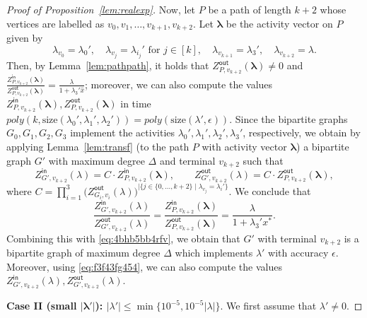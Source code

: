 \documentclass[11pt]{article}
\def\Zin{Z^{\mathsf{in}}}
\def\Zout{Z^{\mathsf{out}}}
\newcommand{\size}[1]{\mathrm{size}(#1)}
\def\lambdab{\ensuremath{\boldsymbol{\lambda}}}
\newcommand{\eps}{\epsilon}
\begin{document}
\begin{proof}[Proof of Proposition~\ref{lem:realexp}]
Now,  let $P$ be a path of length $k+2$ whose vertices are labelled as $v_0,v_1,\hdots,v_{k+1}, v_{k+2}$. Let $\lambdab$ be the activity vector on $P$ given by
\[\lambda_{v_0}=\lambda_0', \quad \lambda_{v_j}=\lambda_{i_j}' \mbox{ for $j\in[k]$}, \quad \lambda_{v_{k+1}}=\lambda_3', \quad \lambda_{v_{k+2}}=\lambda .\]
Then, by Lemma~\ref{lem:pathpath}, it holds that $\Zout_{P,v_{k+2}}(\lambdab)\neq 0$ and $\frac{\Zin_{P,v_{k+2}}(\lambdab)}{\Zout_{P,v_{k+2}}(\lambdab)}=\frac{\lambda}{1+\lambda_3' \hat{x}}$; moreover, we can also compute the values $\Zin_{P,v_{k+2}}(\lambdab),\Zout_{P,v_{k+2}}(\lambdab)$ in time $poly(k, \size{\lambda_0',\lambda_1',\lambda_2'})=poly(\size{\lambda',\eps})$. Since the bipartite graphs $G_0, G_1, G_2,G_3$ implement the activities $\lambda_0',\lambda_1',\lambda_2',\lambda_3'$, respectively, we obtain by applying Lemma~\ref{lem:transf} (to the path $P$ with activity vector $\lambdab$) a bipartite graph $G'$ with maximum degree $\Delta$ and terminal $v_{k+2}$ such that 
\begin{equation}\label{eq:f3f43fg454}
\Zin_{G',v_{k+2}}(\lambda)= C\cdot \Zin_{P,v_{k+2}}(\lambdab),\qquad \Zout_{G',v_{k+2}}(\lambda)=C\cdot \Zout_{P,v_{k+2}}(\lambdab),
\end{equation}
where $C=\prod^3_{i=1}\big(\Zout_{G_i,v_i}(\lambda)\big)^{|\{j\in\{0,\hdots, k+2\}\mid \lambda_{v_j}=\lambda_i'\}}$. We conclude that
\[\frac{\Zin_{G',v_{k+2}}(\lambda)}{\Zout_{G',v_{k+2}}(\lambda)}=\frac{\Zin_{P,v_{k+2}}(\lambdab)}{\Zout_{P,v_{k+2}}(\lambdab)}=\frac{\lambda}{1+\lambda_3' x^*}.\]
Combining this with \eqref{eq:4bhb5bb4rfv}, we obtain that $G'$ with terminal $v_{k+2}$ is a bipartite graph of maximum degree $\Delta$ which implements $\lambda'$ with accuracy $\epsilon$. Moreover, using \eqref{eq:f3f43fg454}, we can also compute the values $\Zin_{G',v_{k+2}}(\lambda),\Zout_{G',v_{k+2}}(\lambda)$.

\vskip 0.2cm

\noindent \textbf{Case II (small $\mathbf{|\lambda'|}$): $|\lambda'|\leq \min\{10^{-5},10^{-5}|\lambda|\}$}. We first assume that $\lambda'\neq 0$. 


\end{proof}
\end{document}
